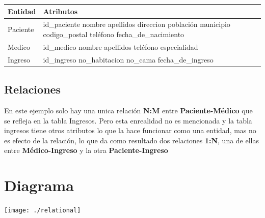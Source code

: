 \documentclass[spanish,12pt,letterpapper]{article}
\begin{document}
		\begin{center}
	\begin{tabular}{| p{4cm} | p{4cm} |}
	\hline
	
	\textbf{Entidad} & \textbf{Atributos}\\
	\hline
	Paciente & id\_paciente \linebreak nombre \linebreak apellidos \linebreak direccion \linebreak población \linebreak municipio \linebreak codigo\_postal \linebreak teléfono \linebreak fecha\_de\_nacimiento\\
	\hline
	Medico & id\_medico \linebreak nombre \linebreak apellidos \linebreak teléfono \linebreak especialidad\\
	\hline
	Ingreso & id\_ingreso \linebreak no\_habitacion \linebreak no\_cama \linebreak fecha\_de\_ingreso \\
	\hline	
	\end{tabular}
	\end{center}
	
	\subsection{Relaciones}
	
	En este ejemplo solo hay una unica relación \textbf{N:M} entre \textbf{Paciente-Médico} que se refleja en la tabla Ingresos. Pero esta enrealidad no es mencionada y la tabla ingresos tiene otros atributos lo que la hace funcionar como una entidad, mas no es efecto de la relación, lo que da como resultado dos relaciones \textbf{1:N}, una de ellas entre \textbf{Médico-Ingreso} y la otra \textbf{Paciente-Ingreso}\\
	
	
	\section{Diagrama\\}
	
	\begin{center}
	\texttt{[image: ./relational]}~\\[1cm] 
    \end{center}
    
\end{document}
